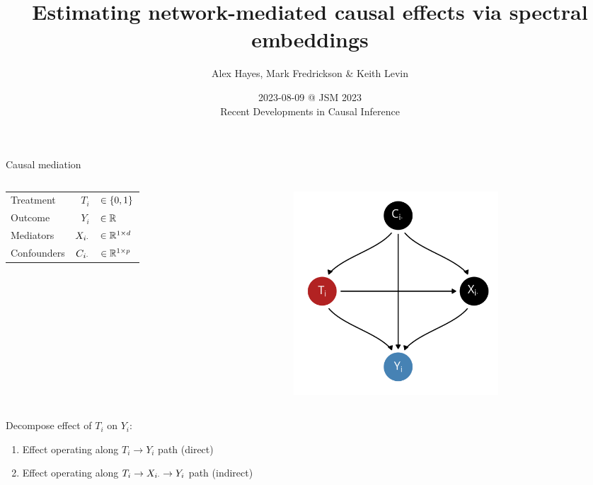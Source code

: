 \documentclass[aspectratio=169]{beamer}
\title{Estimating network-mediated causal effects via spectral embeddings}
\date{2023-08-09 @ JSM 2023 \\ Recent Developments in Causal Inference}
\author{Alex Hayes, Mark Fredrickson \& Keith Levin}
\institute{Department of Statistics, University of Wisconsin-Madison}
\theoremstyle{remark}
\begin{document}
\maketitle

\begin{frame}{Causal mediation}

    \begin{columns}


        \begin{table}[]
            \begin{tabular}{lrl}
                Treatment   & $T_i$          & $\in \{0, 1\} $     \\
                Outcome     & $Y_i$          & $\in \mathbb{R}$              \\
                Mediators   & $X_{i \cdot}$ & $\in \mathbb{R}^{1 \times d}$ \\
                Confounders & $C_{i \cdot}$ & $\in \mathbb{R}^{1 \times p}$
            \end{tabular}
        \end{table}


        \begin{figure}[ht]
            \centering
            \includegraphics[width=0.7\textwidth]{figures/dags/mediating.png}
        \end{figure}
    \end{columns}

    Decompose effect of $T_i$ on $Y_i$:

    \begin{enumerate}
        \item Effect operating along $T_i \to Y_i$ path (direct)
        \item Effect operating along $T_i \to X_{i \cdot} \to Y_i$ path (indirect)
    \end{enumerate}

\end{frame}
\end{document}
